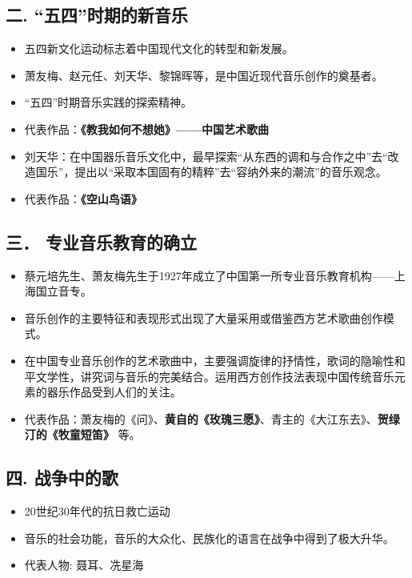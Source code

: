 \documentclass[
]{article}
\providecommand{\tightlist}{%
  \setlength{\itemsep}{0pt}\setlength{\parskip}{0pt}}
\begin{document}
\subsection{二.
``五四''时期的新音乐}\label{ux4e8c.-ux4e94ux56dbux65f6ux671fux7684ux65b0ux97f3ux4e50}

\begin{itemize}
\tightlist
\item
  五四新文化运动标志着中国现代文化的转型和新发展。
\item
  萧友梅、赵元任、刘天华、黎锦晖等，是中国近现代音乐创作的奠基者。
\item
  ``五四''时期音乐实践的探索精神。
\item
  代表作品：\textbf{《教我如何不想她》------中国艺术歌曲}
\item
  刘天华：在中国器乐音乐文化中，最早探索``从东西的调和与合作之中''去``改造国乐''，提出以``采取本国固有的精粹''去``容纳外来的潮流''的音乐观念。
\item
  代表作品：\textbf{《空山鸟语》}
\end{itemize}

\subsection{三．
专业音乐教育的确立}\label{ux4e09-ux4e13ux4e1aux97f3ux4e50ux6559ux80b2ux7684ux786eux7acb}

\begin{itemize}
\tightlist
\item
  蔡元培先生、萧友梅先生于1927年成立了中国第一所专业音乐教育机构------上海国立音专。
\item
  音乐创作的主要特征和表现形式出现了大量采用或借鉴西方艺术歌曲创作模式。
\item
  在中国专业音乐创作的艺术歌曲中，主要强调旋律的抒情性，歌词的隐喻性和平文学性，讲究词与音乐的完美结合。运用西方创作技法表现中国传统音乐元素的器乐作品受到人们的关注。
\item
  代表作品：萧友梅的《问》、\textbf{黄自的《玫瑰三愿》}、青主的《大江东去》、\textbf{贺绿汀的《牧童短笛》}
  等。
\end{itemize}

\subsection{四.
战争中的歌}\label{ux56db.-ux6218ux4e89ux4e2dux7684ux6b4c}

\begin{itemize}
\tightlist
\item
  20世纪30年代的抗日救亡运动
\item
  音乐的社会功能，音乐的大众化、民族化的语言在战争中得到了极大升华。
\item
  代表人物: 聂耳、冼星海
\end{itemize}
\end{document}

